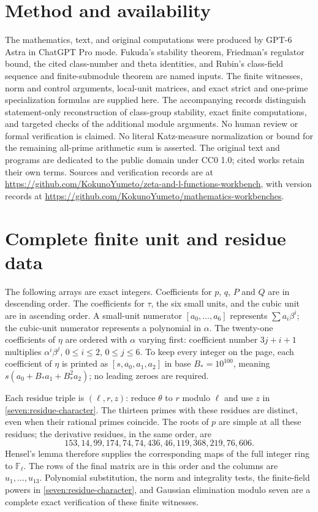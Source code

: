 \documentclass[11pt]{article}
\newcommand{\workbenchurl}{https://github.com/KokunoYumeto/zeta-and-l-functions-workbench}
\newcommand{\recordurl}{https://github.com/KokunoYumeto/mathematics-workbenches}
\begin{document}
\section*{Method and availability}
The mathematics, text, and original computations were produced by
GPT-6 Astra in ChatGPT Pro mode. Fukuda's stability theorem, Friedman's
regulator bound, the cited class-number and theta identities, and Rubin's
class-field sequence and finite-submodule theorem are named inputs.
The finite witnesses, norm and control arguments, local-unit matrices,
and exact strict and one-prime specialization formulas are supplied here.
The accompanying records distinguish statement-only reconstruction of
class-group stability, exact finite computations, and targeted checks
of the additional module arguments. No human review or formal
verification is claimed. No literal Katz-measure normalization or
bound for the remaining all-prime arithmetic sum is asserted.
The original text and programs are dedicated to the public domain under
CC0 1.0; cited works retain their own terms. Sources and verification
records are at \url{\workbenchurl}, with version records at
\url{\recordurl}.

\appendix
\section{Complete finite unit and residue data}
\label{seven:finite-data}

The following arrays are exact integers. Coefficients for $p$, $q$, $P$ and
$Q$ are in descending order. The coefficients for $\tau$, the six small
units, and the cubic unit are in ascending order. A small-unit numerator
$[a_0,\ldots,a_6]$ represents $\sum a_i\beta^i$; the cubic-unit numerator
represents a polynomial in $\alpha$.
The twenty-one coefficients of $\eta$ are ordered with $\alpha$ varying
first: coefficient number $3j+i+1$ multiplies $\alpha^i\beta^j$,
$0\le i\le2$, $0\le j\le6$.
To keep every integer on the page, each coefficient of $\eta$ is printed as
$[s,a_0,a_1,a_2]$ in base $B_*=10^{100}$, meaning
$s(a_0+B_*a_1+B_*^2a_2)$; no leading zeroes are required.

Each residue triple is $(\ell,r,z)$: reduce $\theta$ to $r$ modulo $\ell$
and use $z$ in \eqref{seven:residue-character}. The thirteen primes with
these residues are distinct, even when their rational primes coincide.
The roots of $p$ are simple at all these residues; the derivative residues,
in the same order, are
\[
 153,14,99,174,74,74,436,46,119,368,219,76,606.
\]
Hensel's lemma therefore supplies the corresponding maps of the full
integer ring to $\mathbb F_\ell$.
The rows of the final matrix are in this order and the columns are
$u_1,\ldots,u_{13}$.
Polynomial substitution, the norm and integrality tests, the finite-field
powers in \eqref{seven:residue-character}, and Gaussian elimination modulo
seven are a complete exact verification of these finite witnesses.
\end{document}
